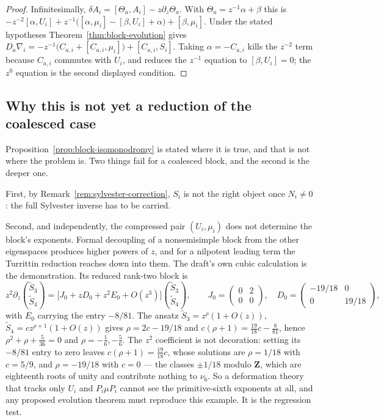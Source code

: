\documentclass[11pt]{article}
\theoremstyle{definition}
\theoremstyle{remark}
\newcommand{\Z}{\mathbf Z}
\begin{document}
\begin{proof}
Infinitesimally, $\delta A_i=[\Theta_a,A_i]-z\partial_z\Theta_a$. With
$\Theta_a=z^{-1}\alpha+\beta$ this is
$-z^{-2}[\alpha,U_i]+z^{-1}\bigl([\alpha,\mu_i]-[\beta,U_i]+\alpha\bigr)+[\beta,\mu_i]$.
Under the stated hypotheses Theorem~\ref{thm:block-evolution} gives
$D_a\nabla_i=-z^{-1}\bigl(C_{a,i}+[C_{a,i},\mu_i]\bigr)+[C_{a,i},S_i]$. Taking
$\alpha=-C_{a,i}$ kills the $z^{-2}$ term because $C_{a,i}$ commutes with $U_i$,
and reduces the $z^{-1}$ equation to $[\beta,U_i]=0$; the $z^0$ equation is the
second displayed condition.
\end{proof}

\subsection*{Why this is not yet a reduction of the coalesced case}
\label{sec:not-yet}

Proposition~\ref{prop:block-isomonodromy} is stated where it is true, and that is
not where the problem is. Two things fail for a coalesced block, and the second
is the deeper one.

First, by Remark~\ref{rem:sylvester-correction}, $S_i$ is not the right object
once $N_i\ne0$: the full Sylvester inverse has to be carried.

Second, and independently, the compressed pair $(U_i,\mu_i)$ does not determine
the block's exponents. Formal decoupling of a nonsemisimple block from the other
eigenspaces produces higher powers of $z$, and for a nilpotent leading term the
Turrittin reduction reaches down into them. The draft's own cubic calculation is
the demonstration. Its reduced rank-two block is
\[
  z^2\partial_z\binom{\widetilde S_3}{\widetilde S_4}
  =\bigl[J_0+zD_0+z^2E_0+O(z^3)\bigr]\binom{\widetilde S_3}{\widetilde S_4},
  \qquad
  J_0=\begin{pmatrix}0&2\\0&0\end{pmatrix},\quad
  D_0=\begin{pmatrix}-19/18&0\\0&19/18\end{pmatrix},
\]
with $E_0$ carrying the entry $-8/81$. The ansatz
$\widetilde S_3=z^\rho(1+O(z))$, $\widetilde S_4=cz^{\rho+1}(1+O(z))$ gives
$\rho=2c-19/18$ and $c(\rho+1)=\tfrac{19}{18}c-\tfrac8{81}$, hence
$\rho^2+\rho+\tfrac5{36}=0$ and $\rho=-\tfrac16,-\tfrac56$. The $z^2$ coefficient
is not decoration: setting its $-8/81$ entry to zero leaves
$c(\rho+1)=\tfrac{19}{18}c$, whose solutions are $\rho=1/18$ with $c=5/9$, and
$\rho=-19/18$ with $c=0$ --- the classes $\pm1/18$ modulo $\Z$, which are
eighteenth roots of unity and contribute nothing to $\nu_6$. So a deformation
theory that tracks only $U_i$ and $P_i\mu P_i$ cannot see the primitive-sixth
exponents at all, and any proposed evolution theorem must reproduce this
example. It is the regression test.
\end{document}
